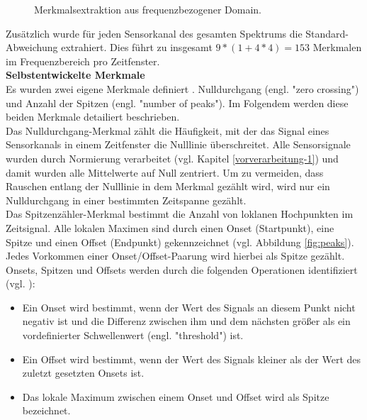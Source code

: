 \begin{figure}[h] 
\caption[Merkmalsextraktion aus frequenzbezogener Domain]{ Merkmalsextraktion aus frequenzbezogener Domain. } 
\label{fig:fft} \end{figure} \vspace{0.5cm}


Zus{\"a}tzlich wurde f{\"u}r jeden Sensorkanal des gesamten Spektrums die Standard-Abweichung  extrahiert. Dies f{\"u}hrt zu insgesamt $9 \ast (1 + 4 \ast 4) = 153$ Merkmalen im Frequenzbereich pro Zeitfenster. \\


\textbf{Selbstentwickelte Merkmale \\}
Es wurden zwei eigene Merkmale definiert \cite{bscpiet}. Nulldurchgang (engl. "zero crossing") und Anzahl der Spitzen (engl. "number of peaks"). Im Folgendem werden diese beiden Merkmale detailiert beschrieben. \\

Das Nulldurchgang-Merkmal z{\"a}hlt die H{\"a}ufigkeit, mit der das Signal eines Sensorkanals in einem Zeitfenster die Nulllinie {\"u}berschreitet.
Alle Sensorsignale wurden durch Normierung verarbeitet (vgl. Kapitel \ref{vorverarbeitung-1}) und damit wurden alle Mittelwerte auf Null zentriert.
Um zu vermeiden, dass Rauschen entlang der Nulllinie in dem Merkmal gez{\"a}hlt wird, wird nur ein Nulldurchgang in einer bestimmten Zeitspanne gez{\"a}hlt. \\


Das Spitzenz{\"a}hler-Merkmal bestimmt die Anzahl von loklanen Hochpunkten im Zeitsignal.
Alle lokalen Maximen sind durch einen Onset (Startpunkt), eine Spitze und einen Offset (Endpunkt) gekennzeichnet (vgl. Abbildung \ref{fig:peaks}). 
Jedes Vorkommen einer Onset/Offset-Paarung wird hierbei als Spitze gez{\"a}hlt.
Onsets, Spitzen und Offsets werden durch die folgenden Operationen identifiziert (vgl. \cite{bscGouverneur}):

\begin{itemize} %
  \item Ein Onset wird bestimmt, wenn der Wert des Signals an diesem Punkt nicht negativ ist und die Differenz zwischen ihm und dem n{\"a}chsten gr{\"o}{\ss}er als ein vordefinierter Schwellenwert (engl. "threshold") ist.

  \item Ein Offset wird bestimmt, wenn der Wert des Signals kleiner als der Wert des zuletzt gesetzten Onsets ist.

  \item Das lokale Maximum zwischen einem Onset und Offset wird als Spitze bezeichnet.
\end{itemize} \vspace{0.2cm}


